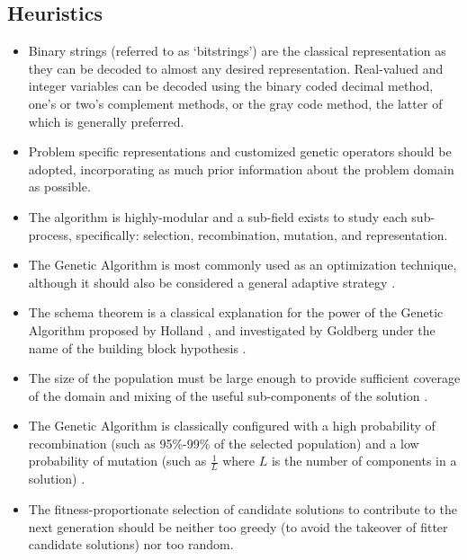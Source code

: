 \subsection{Heuristics}
\begin{itemize}
	\item Binary strings (referred to as `bitstrings') are the classical representation as they can be decoded to almost any desired representation. Real-valued and integer variables can be decoded using the binary coded decimal method, one's or two's complement methods, or the gray code method, the latter of which is generally preferred.
	\item Problem specific representations and customized genetic operators should be adopted, incorporating as much prior information about the problem domain as possible.
	\item The algorithm is highly-modular and a sub-field exists to study each sub-process, specifically: selection, recombination, mutation, and representation. 
	\item The Genetic Algorithm is most commonly used as an optimization technique, although it should also be considered a general adaptive strategy \cite{Jong1992}.
	\item The schema theorem is a classical explanation for the power of the Genetic Algorithm proposed by Holland  \cite{Holland1975}, and investigated by Goldberg under the name of the building block hypothesis \cite{Goldberg1989}.
	\item The size of the population must be large enough to provide sufficient coverage of the domain and mixing of the useful sub-components of the solution  \cite{Goldberg1992}.
	\item The Genetic Algorithm is classically configured with a high probability of recombination (such as 95\%-99\% of the selected population) and a low probability of mutation (such as $\frac{1}{L}$ where $L$ is the number of components in a solution) \cite{Muhlenbein1992, Back1993}.
	\item The fitness-proportionate selection of candidate solutions to contribute to the next generation should be neither too greedy (to avoid the takeover of fitter candidate solutions) nor too random.
\end{itemize}

